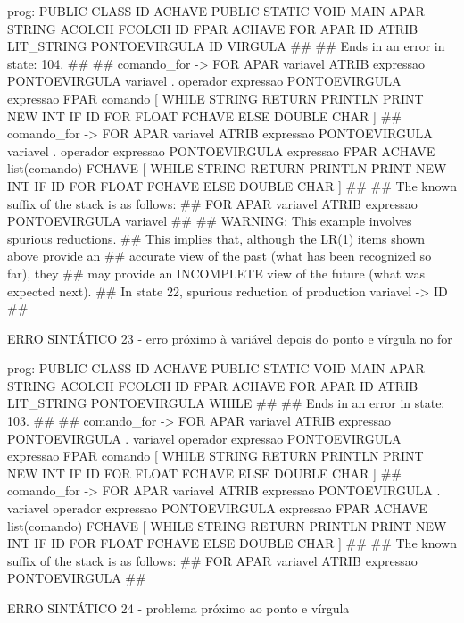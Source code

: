 \documentclass[12pt,a4paper,twoside]{report}
\begin{document}
\begin{terminal}
prog: PUBLIC CLASS ID ACHAVE PUBLIC STATIC VOID MAIN APAR STRING ACOLCH FCOLCH ID FPAR ACHAVE FOR APAR ID ATRIB LIT_STRING PONTOEVIRGULA ID VIRGULA 
##
## Ends in an error in state: 104.
##
## comando_for -> FOR APAR variavel ATRIB expressao PONTOEVIRGULA variavel . operador expressao PONTOEVIRGULA expressao FPAR comando [ WHILE STRING RETURN PRINTLN PRINT NEW INT IF ID FOR FLOAT FCHAVE ELSE DOUBLE CHAR ]
## comando_for -> FOR APAR variavel ATRIB expressao PONTOEVIRGULA variavel . operador expressao PONTOEVIRGULA expressao FPAR ACHAVE list(comando) FCHAVE [ WHILE STRING RETURN PRINTLN PRINT NEW INT IF ID FOR FLOAT FCHAVE ELSE DOUBLE CHAR ]
##
## The known suffix of the stack is as follows:
## FOR APAR variavel ATRIB expressao PONTOEVIRGULA variavel 
##
## WARNING: This example involves spurious reductions.
## This implies that, although the LR(1) items shown above provide an
## accurate view of the past (what has been recognized so far), they
## may provide an INCOMPLETE view of the future (what was expected next).
## In state 22, spurious reduction of production variavel -> ID 
##

ERRO SINTÁTICO 23 -  erro próximo à variável depois do ponto e vírgula no for

prog: PUBLIC CLASS ID ACHAVE PUBLIC STATIC VOID MAIN APAR STRING ACOLCH FCOLCH ID FPAR ACHAVE FOR APAR ID ATRIB LIT_STRING PONTOEVIRGULA WHILE 
##
## Ends in an error in state: 103.
##
## comando_for -> FOR APAR variavel ATRIB expressao PONTOEVIRGULA . variavel operador expressao PONTOEVIRGULA expressao FPAR comando [ WHILE STRING RETURN PRINTLN PRINT NEW INT IF ID FOR FLOAT FCHAVE ELSE DOUBLE CHAR ]
## comando_for -> FOR APAR variavel ATRIB expressao PONTOEVIRGULA . variavel operador expressao PONTOEVIRGULA expressao FPAR ACHAVE list(comando) FCHAVE [ WHILE STRING RETURN PRINTLN PRINT NEW INT IF ID FOR FLOAT FCHAVE ELSE DOUBLE CHAR ]
##
## The known suffix of the stack is as follows:
## FOR APAR variavel ATRIB expressao PONTOEVIRGULA 
##

ERRO SINTÁTICO 24 -  problema próximo ao ponto e vírgula


\end{terminal}
\end{document}

